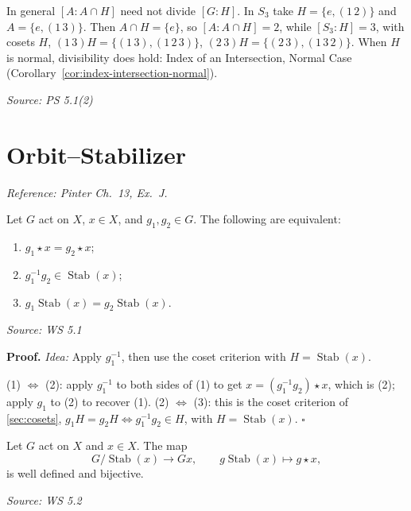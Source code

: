 \documentclass[11pt]{report}
\renewenvironment{proof}[1][Proof]{\noindent\textbf{#1.} }{\hfill$\square$\par\vspace{5pt}}
\newcommand{\srcline}[1]{\par\hfill{\footnotesize\textit{Source: #1}}}
\begin{document}
\begin{exbox}\label{ex:index-need-not-divide}
In general $[A : A \cap H]$ need not divide $[G : H]$. In $S_3$ take $H = \{e, (1\,2)\}$ and $A = \{e, (1\,3)\}$. Then $A \cap H = \{e\}$, so $[A : A \cap H] = 2$, while $[S_3 : H] = 3$, with cosets $H$, $(1\,3)H = \{(1\,3), (1\,2\,3)\}$, $(2\,3)H = \{(2\,3), (1\,3\,2)\}$. When $H$ is normal, divisibility does hold: Index of an Intersection, Normal Case (Corollary~\ref{cor:index-intersection-normal}).
\srcline{PS 5.1(2)}
\end{exbox}


\section{Orbit--Stabilizer}\label{sec:orbit-stabilizer}

\textit{Reference: Pinter Ch.\ 13, Ex.\ J.}

\begin{propbox}\label{prop:when-two-group-elements-move-x-same-place}
Let $G$ act on $X$, $x \in X$, and $g_1, g_2 \in G$. The following are equivalent:
\begin{enumerate}
    \item $g_1 \star x = g_2 \star x$;
    \item $g_1^{-1}g_2 \in \operatorname{Stab}(x)$;
    \item $g_1\operatorname{Stab}(x) = g_2\operatorname{Stab}(x)$.
\end{enumerate}
\srcline{WS 5.1}
\end{propbox}

\begin{proof}
\textit{Idea:} Apply $g_1^{-1}$, then use the coset criterion with $H = \operatorname{Stab}(x)$.\par
(1) $\Leftrightarrow$ (2): apply $g_1^{-1}$ to both sides of (1) to get $x = (g_1^{-1}g_2) \star x$, which is (2); apply $g_1$ to (2) to recover (1). (2) $\Leftrightarrow$ (3): this is the coset criterion of \ref{sec:cosets}, $g_1H = g_2H \iff g_1^{-1}g_2 \in H$, with $H = \operatorname{Stab}(x)$.
\end{proof}

\begin{propbox}\label{prop:orbit-bijection}
Let $G$ act on $X$ and $x \in X$. The map
\[ G/\operatorname{Stab}(x) \longrightarrow Gx, \qquad g\operatorname{Stab}(x) \longmapsto g \star x, \]
is well defined and bijective.
\srcline{WS 5.2}
\end{propbox}
\end{document}
